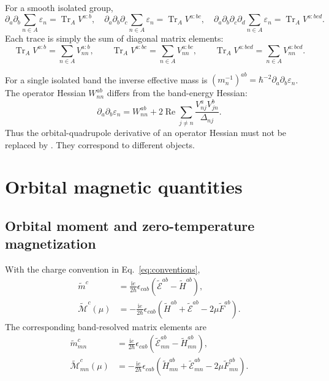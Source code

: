 \documentclass[prx,amsmath,amssymb,superscriptaddress,longbibliography]{revtex4-2}
\newcommand{\Tr}{\operatorname{Tr}}
\newcommand{\Rea}{\operatorname{Re}}
\newcommand{\ii}{\mathrm{i}}
\newcommand{\code}[1]{\texttt{\detokenize{#1}}}
\begin{document}
For a smooth isolated group,
\begin{equation}
 \partial_a\partial_b\sum_{n\in A}\varepsilon_n=\Tr_A V^{a:b},\quad
 \partial_a\partial_b\partial_c\sum_{n\in A}\varepsilon_n=\Tr_A V^{a:bc},\quad
 \partial_a\partial_b\partial_c\partial_d\sum_{n\in A}\varepsilon_n=\Tr_A V^{a:bcd}.
 \label{eq:energy-traces}
\end{equation}
Each trace is simply the sum of diagonal matrix elements:
\begin{equation}
 \Tr_A V^{a:b}=\sum_{n\in A}V_{nn}^{a:b},\qquad
 \Tr_A V^{a:bc}=\sum_{n\in A}V_{nn}^{a:bc},\qquad
 \Tr_A V^{a:bcd}=\sum_{n\in A}V_{nn}^{a:bcd}.
 \label{eq:energy-trace-components}
\end{equation}

For a single isolated band the inverse effective mass is
$(m_n^{-1})^{ab}=\hbar^{-2}\partial_a\partial_b\varepsilon_n$.
The operator Hessian $W_{nn}^{ab}$ differs from the band-energy Hessian:
\begin{equation}
 \partial_a\partial_b\varepsilon_n
 =W_{nn}^{ab}+2\Rea\sum_{j\ne n}\frac{V_{nj}^aV_{jn}^b}{\Delta_{nj}}.
 \label{eq:hessian-distinction}
\end{equation}
Thus the orbital-quadrupole derivative of an operator Hessian must not be
replaced by \code{Der3E}. They correspond to different objects.

\section{Orbital magnetic quantities}
\label{sec:orbital}

\subsection{Orbital moment and zero-temperature magnetization}
With the charge convention in Eq.~\eqref{eq:conventions},
\begin{align}
 \widetilde m^c&=\frac{\ii e}{2\hbar}\epsilon_{cab}
                      (\widetilde{\mathcal E}^{ab}-\widetilde H^{ab}),\label{eq:moment}\\
 \widetilde{\mathcal M}^c(\mu)
 &=-\frac{\ii e}{2\hbar}\epsilon_{cab}
    (\widetilde H^{ab}+\widetilde{\mathcal E}^{ab}-2\mu\widetilde F^{ab}).
 \label{eq:magnetization}
\end{align}
The corresponding band-resolved matrix elements are
\begin{align}
 \widetilde m_{mn}^c&=\frac{\ii e}{2\hbar}\epsilon_{cab}
 (\widetilde{\mathcal E}_{mn}^{ab}-\widetilde H_{mn}^{ab}),\nonumber\\
 \widetilde{\mathcal M}_{mn}^c(\mu)&=-\frac{\ii e}{2\hbar}\epsilon_{cab}
 (\widetilde H_{mn}^{ab}+\widetilde{\mathcal E}_{mn}^{ab}-2\mu\widetilde F_{mn}^{ab}).
 \label{eq:orbital-components}
\end{align}
\end{document}
